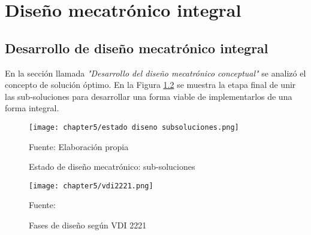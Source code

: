 
\pagestyle{myportland}
\doublespacing
\chapter[----- Diseño mecatrónico integral]{Diseño mecatrónico integral}
\thispagestyle{myportland}


\section{Desarrollo de diseño mecatrónico integral}

En la sección llamada \textit{"Desarrollo del diseño mecatrónico conceptual"} \cite{DiazVergara2020} se analizó el concepto de solución óptimo. En la Figura \ref{fig:estado diseno mecatronico etapa 3} se muestra la etapa final de unir las sub-soluciones para desarrollar una forma viable de implementarlos de una forma integral.

\begin{figure}[H]
	\centering
	\texttt{[image: chapter5/estado diseno subsoluciones.png]}
	\caption{Estado de diseño mecatrónico: sub-soluciones}
	\begin{myflushleftportland}
		Fuente: Elaboración propia
	\end{myflushleftportland}
	\label{fig:estado diseno mecatronico etapa 3}
\end{figure}

\begin{figure}[H]
	\centering
	\texttt{[image: chapter5/vdi2221.png]}
	\caption{Fases de diseño según VDI 2221}
	\begin{myflushleftportland}
		Fuente: \cite{Pahl2007}
	\end{myflushleftportland}
	\label{fig:estado diseno mecatronico etapa 3}
\end{figure}

